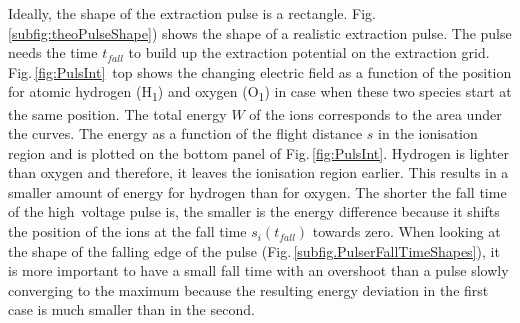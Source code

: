 	Ideally, the shape of the extraction pulse is a rectangle. Fig.\,\ref{subfig:theoPulseShape}) shows the shape of a realistic extraction pulse. The pulse needs the time $t_{fall}$ to build up the extraction potential on the extraction grid. Fig.\,\ref{fig:PulsInt}~top shows the changing electric field as a function of the position for atomic hydrogen (H\textsubscript{1}) and oxygen (O\textsubscript{1}) in case when these two species start at the same position. The total energy $W$ of the ions corresponds to the area under the curves. The energy as a function of the flight distance $s$ in the ionisation region and is plotted on the bottom panel of Fig.\,\ref{fig:PulsInt}. Hydrogen is lighter than oxygen and therefore, it leaves the ionisation region earlier. This results in a smaller amount of energy for hydrogen than for oxygen. The shorter the fall time of the high~voltage pulse is, the smaller is the energy difference because it shifts the position of the ions at the fall time $s_i(t_{fall})$ towards zero. When looking at the shape of the falling edge of the pulse (Fig.\,\ref{subfig.PulserFallTimeShapes}), it is more important to have a small fall time with an overshoot than a pulse slowly converging to the maximum because the resulting energy deviation in the first case is much smaller than in the second.\\
	
